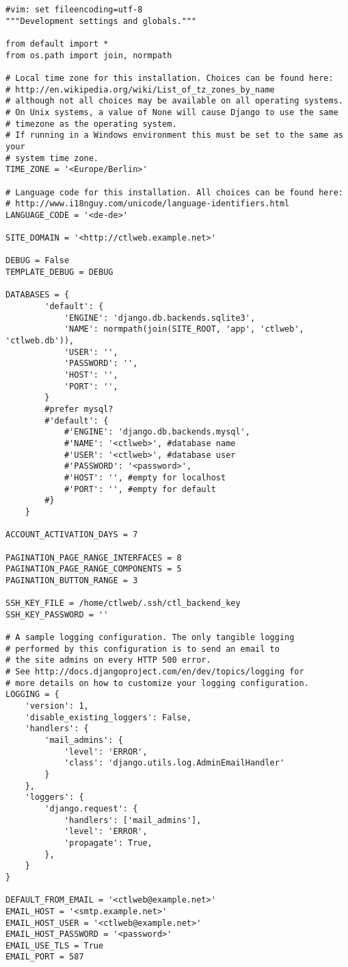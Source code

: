 \begin{lstlisting}
#vim: set fileencoding=utf-8
"""Development settings and globals."""

from default import *
from os.path import join, normpath

# Local time zone for this installation. Choices can be found here:
# http://en.wikipedia.org/wiki/List_of_tz_zones_by_name
# although not all choices may be available on all operating systems.
# On Unix systems, a value of None will cause Django to use the same 
# timezone as the operating system.
# If running in a Windows environment this must be set to the same as your
# system time zone.
TIME_ZONE = '<Europe/Berlin>'

# Language code for this installation. All choices can be found here:
# http://www.i18nguy.com/unicode/language-identifiers.html
LANGUAGE_CODE = '<de-de>'

SITE_DOMAIN = '<http://ctlweb.example.net>'

DEBUG = False
TEMPLATE_DEBUG = DEBUG

DATABASES = {
        'default': {
            'ENGINE': 'django.db.backends.sqlite3',
            'NAME': normpath(join(SITE_ROOT, 'app', 'ctlweb', 'ctlweb.db')),
            'USER': '',
            'PASSWORD': '',
            'HOST': '',
            'PORT': '',
        }
        #prefer mysql?
        #'default': {
            #'ENGINE': 'django.db.backends.mysql',
            #'NAME': '<ctlweb>', #database name
            #'USER': '<ctlweb>', #database user
            #'PASSWORD': '<password>',
            #'HOST': '', #empty for localhost
            #'PORT': '', #empty for default
        #}
    }

ACCOUNT_ACTIVATION_DAYS = 7

PAGINATION_PAGE_RANGE_INTERFACES = 8
PAGINATION_PAGE_RANGE_COMPONENTS = 5
PAGINATION_BUTTON_RANGE = 3

SSH_KEY_FILE = /home/ctlweb/.ssh/ctl_backend_key
SSH_KEY_PASSWORD = ''

# A sample logging configuration. The only tangible logging
# performed by this configuration is to send an email to
# the site admins on every HTTP 500 error.
# See http://docs.djangoproject.com/en/dev/topics/logging for
# more details on how to customize your logging configuration.
LOGGING = {
    'version': 1,
    'disable_existing_loggers': False,
    'handlers': {
        'mail_admins': {
            'level': 'ERROR',
            'class': 'django.utils.log.AdminEmailHandler'
        }
    },
    'loggers': {
        'django.request': {
            'handlers': ['mail_admins'],
            'level': 'ERROR',
            'propagate': True,
        },
    }
}

DEFAULT_FROM_EMAIL = '<ctlweb@example.net>'
EMAIL_HOST = '<smtp.example.net>'
EMAIL_HOST_USER = '<ctlweb@example.net>'
EMAIL_HOST_PASSWORD = '<password>'
EMAIL_USE_TLS = True
EMAIL_PORT = 587
\end{lstlisting}

